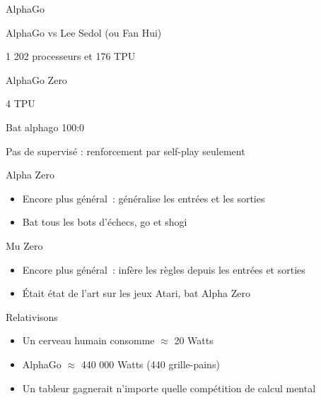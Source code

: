 \begin{frame}{AlphaGo}
  \begin{center}
    AlphaGo vs Lee Sedol (ou Fan Hui)
  \end{center}
  \huge
  1 202 processeurs et 176 TPU
\end{frame}

\begin{frame}{AlphaGo Zero}
  \begin{description}[<+->]
    \item[Plus simple] 4 TPU
    \item[Plus fort] Bat alphago 100:0
    \item[Plus général] Pas de supervisé : renforcement par self-play seulement
  \end{description}
\end{frame}

\begin{frame}{Alpha Zero}
  \begin{itemize}[<+->]
    \item Encore plus général~: généralise les entrées et les sorties
    \item Bat tous les bots d'échecs, go et shogi
  \end{itemize}  
\end{frame}

\begin{frame}{Mu Zero}
  \begin{itemize}[<+->]
    \item Encore plus général~: infère les règles depuis les entrées et sorties
    \item Était état de l'art sur les jeux Atari, bat Alpha Zero
  \end{itemize}
\end{frame}

\begin{frame}{Relativisons}
  \begin{itemize}[<+->]
    \item Un cerveau humain consomme $\approx$ 20 Watts
    \item AlphaGo $\approx$ 440 000 Watts (440 grille-pains)
    \item Un tableur gagnerait n'importe quelle compétition de calcul mental
  \end{itemize}
\end{frame}

